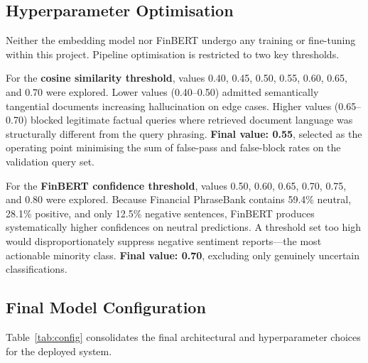 \documentclass[10pt,twocolumn]{article}
\begin{document}
\subsection{Hyperparameter Optimisation}

Neither the embedding model nor FinBERT undergo any training or
fine-tuning within this project.
Pipeline optimisation is restricted to two key thresholds.

For the \textbf{cosine similarity threshold}, values 0.40, 0.45,
0.50, 0.55, 0.60, 0.65, and 0.70 were explored.
Lower values (0.40--0.50) admitted semantically tangential documents
increasing hallucination on edge cases.
Higher values (0.65--0.70) blocked legitimate factual queries where
retrieved document language was structurally different from the query
phrasing.
\textbf{Final value: 0.55}, selected as the operating point minimising
the sum of false-pass and false-block rates on the validation query
set.

For the \textbf{FinBERT confidence threshold}, values 0.50, 0.60,
0.65, 0.70, 0.75, and 0.80 were explored.
Because Financial PhraseBank contains 59.4\% neutral, 28.1\% positive,
and only 12.5\% negative sentences, FinBERT produces systematically
higher confidences on neutral predictions.
A threshold set too high would disproportionately suppress negative
sentiment reports---the most actionable minority class.
\textbf{Final value: 0.70}, excluding only genuinely uncertain
classifications.

\subsection{Final Model Configuration}

Table~\ref{tab:config} consolidates the final architectural and
hyperparameter choices for the deployed system.
\end{document}
